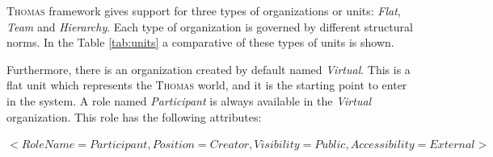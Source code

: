 \textsc{Thomas} framework gives support for three types of organizations or units: \textit{Flat}, \textit{Team} and \textit{Hierarchy}. Each type of organization is governed by different structural norms. In the Table \ref{tab:units} a comparative of these types of units is shown.

Furthermore, there is an organization created by default named \textit{Virtual}. This is a flat unit which represents the \textsc{Thomas} world, and it is the starting point to enter in the system. A role named \textit{Participant} is always available in the \textit{Virtual} organization. This role has the following attributes:

 $<RoleName = Participant, Position = Creator, Visibility = Public, Accessibility = External>$




